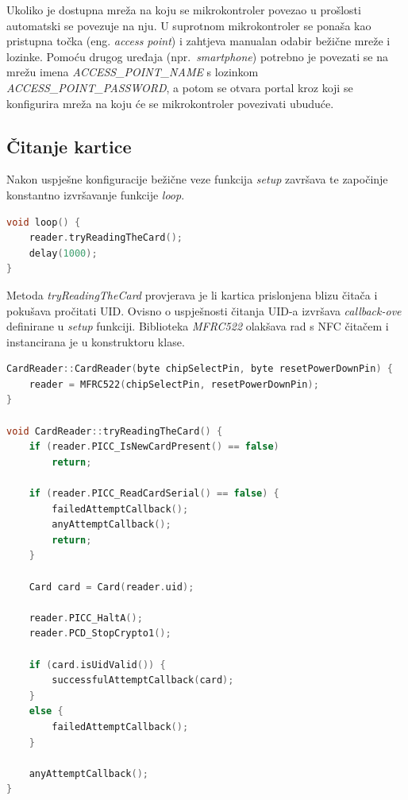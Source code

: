 Ukoliko je dostupna mreža na koju se mikrokontroler povezao u prošlosti automatski se povezuje na nju.
U suprotnom mikrokontroler se ponaša kao pristupna točka (eng. \textit{access point}) i zahtjeva manualan odabir
bežične mreže i lozinke.
Pomoću drugog uređaja (npr.~\textit{smartphone}) potrebno je povezati se na mrežu imena \textit{ACCESS\_POINT\_NAME} s
lozinkom \textit{ACCESS\_POINT\_PASSWORD}, a potom se otvara portal kroz koji se konfigurira mreža na koju će se
mikrokontroler povezivati ubuduće.

\clearpage

\subsection{Čitanje kartice}

Nakon uspješne konfiguracije bežične veze funkcija \textit{setup} završava te započinje konstantno izvršavanje funkcije
\textit{loop}.

\begin{lstlisting}[language=C++]
void loop() {
    reader.tryReadingTheCard();
    delay(1000);
}
\end{lstlisting}

Metoda \textit{tryReadingTheCard} provjerava je li kartica prislonjena blizu čitača i pokušava pročitati UID\@.
Ovisno o uspješnosti čitanja UID-a izvršava \textit{callback-ove} definirane u \textit{setup} funkciji.
Biblioteka \textit{MFRC522} olakšava rad s NFC čitačem i instancirana je u konstruktoru klase.

\begin{lstlisting}[language=C++]
CardReader::CardReader(byte chipSelectPin, byte resetPowerDownPin) {
    reader = MFRC522(chipSelectPin, resetPowerDownPin);
}

void CardReader::tryReadingTheCard() {
    if (reader.PICC_IsNewCardPresent() == false)
        return;

    if (reader.PICC_ReadCardSerial() == false) {
        failedAttemptCallback();
        anyAttemptCallback();
        return;
    }

    Card card = Card(reader.uid);

    reader.PICC_HaltA();
    reader.PCD_StopCrypto1();

    if (card.isUidValid()) {
        successfulAttemptCallback(card);
    }
    else {
        failedAttemptCallback();
    }

    anyAttemptCallback();
}
\end{lstlisting}


